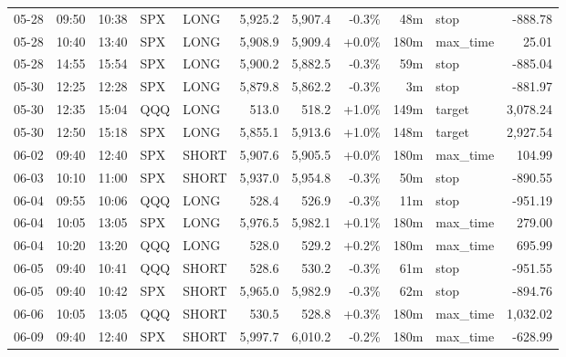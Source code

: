 \documentclass[11pt,a4paper,twoside]{article}
\begin{document}
\begin{center}
\begin{longtable}{>{\color{txtmain}}l l l l l r r r r >{\color{txtmain}}l r}
05-28 & 09:50 & 10:38 & SPX & LONG & 5,925.2 & 5,907.4 & \textcolor{lossred}{-0.3\%} & 48m & stop & \textcolor{lossred}{-888.78} \\
05-28 & 10:40 & 13:40 & SPX & LONG & 5,908.9 & 5,909.4 & \textcolor{wingreen}{+0.0\%} & 180m & max\_time & \textcolor{wingreen}{25.01} \\
05-28 & 14:55 & 15:54 & SPX & LONG & 5,900.2 & 5,882.5 & \textcolor{lossred}{-0.3\%} & 59m & stop & \textcolor{lossred}{-885.04} \\
05-30 & 12:25 & 12:28 & SPX & LONG & 5,879.8 & 5,862.2 & \textcolor{lossred}{-0.3\%} & 3m & stop & \textcolor{lossred}{-881.97} \\
05-30 & 12:35 & 15:04 & QQQ & LONG & 513.0 & 518.2 & \textcolor{wingreen}{+1.0\%} & 149m & target & \textcolor{wingreen}{3,078.24} \\
05-30 & 12:50 & 15:18 & SPX & LONG & 5,855.1 & 5,913.6 & \textcolor{wingreen}{+1.0\%} & 148m & target & \textcolor{wingreen}{2,927.54} \\
06-02 & 09:40 & 12:40 & SPX & SHORT & 5,907.6 & 5,905.5 & \textcolor{wingreen}{+0.0\%} & 180m & max\_time & \textcolor{wingreen}{104.99} \\
06-03 & 10:10 & 11:00 & SPX & SHORT & 5,937.0 & 5,954.8 & \textcolor{lossred}{-0.3\%} & 50m & stop & \textcolor{lossred}{-890.55} \\
06-04 & 09:55 & 10:06 & QQQ & LONG & 528.4 & 526.9 & \textcolor{lossred}{-0.3\%} & 11m & stop & \textcolor{lossred}{-951.19} \\
06-04 & 10:05 & 13:05 & SPX & LONG & 5,976.5 & 5,982.1 & \textcolor{wingreen}{+0.1\%} & 180m & max\_time & \textcolor{wingreen}{279.00} \\
06-04 & 10:20 & 13:20 & QQQ & LONG & 528.0 & 529.2 & \textcolor{wingreen}{+0.2\%} & 180m & max\_time & \textcolor{wingreen}{695.99} \\
06-05 & 09:40 & 10:41 & QQQ & SHORT & 528.6 & 530.2 & \textcolor{lossred}{-0.3\%} & 61m & stop & \textcolor{lossred}{-951.55} \\
06-05 & 09:40 & 10:42 & SPX & SHORT & 5,965.0 & 5,982.9 & \textcolor{lossred}{-0.3\%} & 62m & stop & \textcolor{lossred}{-894.76} \\
06-06 & 10:05 & 13:05 & QQQ & SHORT & 530.5 & 528.8 & \textcolor{wingreen}{+0.3\%} & 180m & max\_time & \textcolor{wingreen}{1,032.02} \\
06-09 & 09:40 & 12:40 & SPX & SHORT & 5,997.7 & 6,010.2 & \textcolor{lossred}{-0.2\%} & 180m & max\_time & \textcolor{lossred}{-628.99} \\

\end{longtable}
\end{center}
\end{document}
